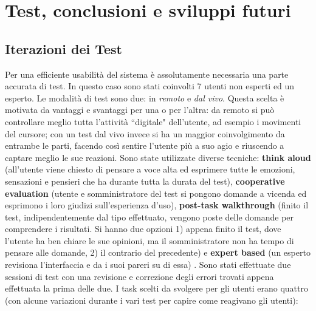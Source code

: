 \documentclass[a4paper,10pt]{memoir}
\begin{document}
\clearpage


\chapter{Test, conclusioni e sviluppi futuri}

\section{Iterazioni dei Test}

Per una efficiente usabilità del sistema è assolutamente necessaria una parte accurata di test.
In questo caso sono stati coinvolti 7 utenti non esperti ed un esperto.
Le modalità di test sono due: in \textit{remoto} e \textit{dal vivo}. Questa scelta è motivata da vantaggi e svantaggi per una o per l'altra: da remoto si può controllare meglio tutta l'attività ``digitale" dell'utente, ad esempio i movimenti del cursore; con un test dal vivo invece si ha un maggior coinvolgimento da entrambe le parti, facendo così sentire l'utente più a suo agio e riuscendo a captare meglio le sue reazioni.
Sono state utilizzate diverse tecniche: \textbf{think aloud} (all'utente viene chiesto di pensare a voce alta ed esprimere tutte le emozioni, sensazioni e pensieri che ha durante tutta la durata del test), \textbf{cooperative evaluation} (utente e somministratore del test si pongono domande a vicenda ed esprimono i loro giudizi sull'esperienza d'uso), \textbf{post-task walkthrough} (finito il test, indipendentemente dal tipo effettuato, vengono poste delle domande per comprendere i risultati. Si hanno due opzioni 1) appena finito il test, dove l'utente ha ben chiare le sue opinioni, ma il somministratore non ha tempo di pensare alle domande, 2) il contrario del precedente) e \textbf{expert based} (un esperto revisiona l'interfaccia e da i suoi pareri su di essa) \cite{hcibook}.
Sono stati effettuate due sessioni di test con una revisione e correzione degli errori trovati appena effettuata la prima delle due.
I task scelti da svolgere per gli utenti erano quattro (con alcune variazioni durante i vari test per capire come reagivano gli utenti):
\end{document}
